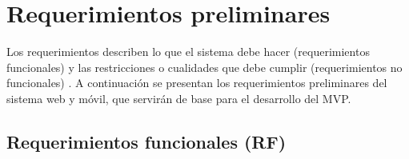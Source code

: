 
\section{Requerimientos preliminares}

Los requerimientos describen lo que el sistema debe hacer (requerimientos
funcionales) y las restricciones o cualidades que debe cumplir
(requerimientos no funcionales) \citep{sommerville2011, kendall2011}. A
continuaci\'on se presentan los requerimientos preliminares del sistema web y
m\'ovil, que servir\'an de base para el desarrollo del MVP.

\subsection{Requerimientos funcionales (RF)}

